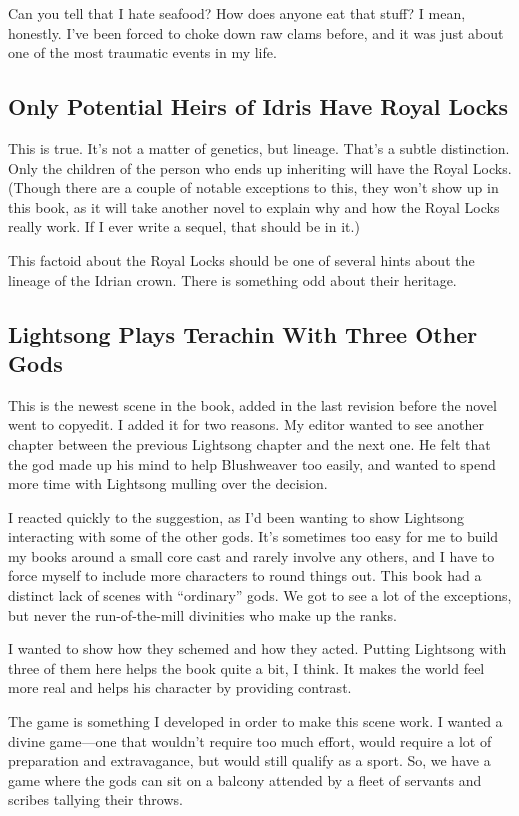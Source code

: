 Can you tell that I hate seafood? How does anyone eat that stuff? I mean, honestly. I’ve been forced to choke down raw clams before, and it was just about one of the most traumatic events in my life.

\subsection*{Only Potential Heirs of Idris Have Royal Locks}

This is true. It’s not a matter of genetics, but lineage. That’s a subtle distinction. Only the children of the person who ends up inheriting will have the Royal Locks. (Though there are a couple of notable exceptions to this, they won’t show up in this book, as it will take another novel to explain why and how the Royal Locks really work. If I ever write a sequel, that should be in it.)

This factoid about the Royal Locks should be one of several hints about the lineage of the Idrian crown. There is something odd about their heritage.



\subsection*{Lightsong Plays Terachin With Three Other Gods}

This is the newest scene in the book, added in the last revision before the novel went to copyedit. I added it for two reasons. My editor wanted to see another chapter between the previous Lightsong chapter and the next one. He felt that the god made up his mind to help Blushweaver too easily, and wanted to spend more time with Lightsong mulling over the decision.

I reacted quickly to the suggestion, as I’d been wanting to show Lightsong interacting with some of the other gods. It’s sometimes too easy for me to build my books around a small core cast and rarely involve any others, and I have to force myself to include more characters to round things out. This book had a distinct lack of scenes with “ordinary” gods. We got to see a lot of the exceptions, but never the run-of-the-mill divinities who make up the ranks.

I wanted to show how they schemed and how they acted. Putting Lightsong with three of them here helps the book quite a bit, I think. It makes the world feel more real and helps his character by providing contrast.

The game is something I developed in order to make this scene work. I wanted a divine game—one that wouldn’t require too much effort, would require a lot of preparation and extravagance, but would still qualify as a sport. So, we have a game where the gods can sit on a balcony attended by a fleet of servants and scribes tallying their throws.

